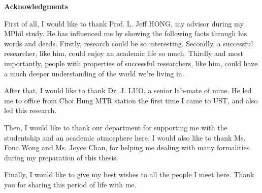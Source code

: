 \centerline{{\bf \Large Acknowledgments}} \vspace{5mm} \noindent

First of all, I would like to thank Prof. L. Jeff HONG, my advisor during my MPhil study. He has influenced me by showing the following facts through his words and deeds. Firstly, research could be so interesting. Secondly, a successful researcher, like him, could enjoy an academic life so much. Thirdly and most importantly, people with properties of successful researchers, like him, could have a much deeper understanding of the world we're living in.

After that, I would like to thank Dr. J. LUO, a senior lab-mate of mine. He led me to office from Choi Hung MTR station the first time I came to UST, and also led this research.

Then, I would like to thank our department for supporting me with the studentship and an academic atmosphere here. I would also like to thank Ms. Fona Wong and Ms. Joyce Chan, for helping me dealing with many formalities during my preparation of this thesis.

Finally, I would like to give my best wishes to all the people I meet here. Thank you for sharing this period of life with me.
